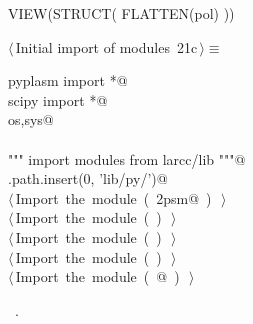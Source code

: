 \documentclass[11pt,oneside]{article}	%
\begin{document}
VIEW(STRUCT( FLATTEN(pol) ))


\begin{flushleft} \small \label{scrap41}
\protect{}$\langle\,$Initial import of modules\nobreak\ {\footnotesize 21c}$\,\rangle\equiv$
\vspace{-1ex}
\begin{list}{}{} \item
\mbox{}\verb@from pyplasm import *@\\
\mbox{}\verb@from scipy import *@\\
\mbox{}\verb@import os,sys@\\
\mbox{}\verb@@\\
\mbox{}\verb@""" import modules from larcc/lib """@\\
\mbox{}\verb@sys.path.insert(0, 'lib/py/')@\\
\mbox{}\verb@@\hbox{$\langle\,$Import the module\nobreak\ ({\footnotesize {}\label{scrap42}
 }\mbox{}\verb@lar2psm@ ) {\footnotesize {}}$\,\rangle$}\verb@@\\
\mbox{}\verb@@\hbox{$\langle\,$Import the module\nobreak\ ({\footnotesize {}\label{scrap43}
 }\mbox{}\verb@simplexn@ ) {\footnotesize {}}$\,\rangle$}\verb@@\\
\mbox{}\verb@@\hbox{$\langle\,$Import the module\nobreak\ ({\footnotesize {}\label{scrap44}
 }\mbox{}\verb@larcc@ ) {\footnotesize {}}$\,\rangle$}\verb@@\\
\mbox{}\verb@@\hbox{$\langle\,$Import the module\nobreak\ ({\footnotesize {}\label{scrap45}
 }\mbox{}\verb@largrid@ ) {\footnotesize {}}$\,\rangle$}\verb@@\\
\mbox{}\verb@@\hbox{$\langle\,$Import the module\nobreak\ ({\footnotesize {}\label{scrap46}
 }\mbox{}@ ) {\footnotesize {}}$\,\rangle$}\verb@@\\
\mbox{}\verb@@{\NWsep}
\end{list}
\vspace{-1ex}
\footnotesize\addtolength{\baselineskip}{-1ex}
\begin{list}{}{\setlength{\itemsep}{-\parsep}\setlength{\itemindent}{-\leftmargin}}
\item \NWtxtMacroRefIn\ .
\end{list}
\end{flushleft}
\end{document}
